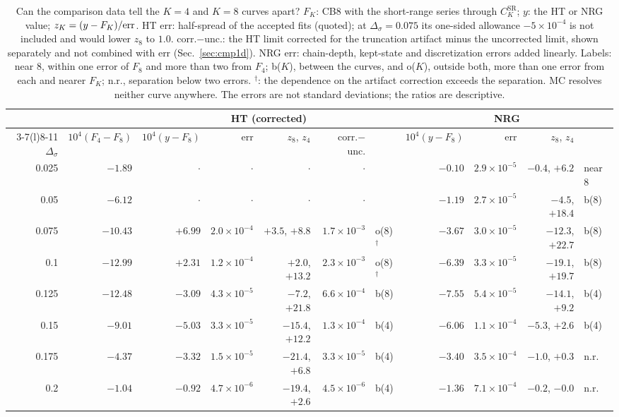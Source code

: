 \documentclass[11pt,a4paper]{article}
\numberwithin{equation}{section}
\newcommand{\Ds}{\Delta_\sigma}
\newcommand{\CSR}{C^{\mathrm{SR}}}
\newcommand{\sci}[2]{#1\times10^{#2}}
\begin{document}
\begin{table}[htbp]\centering\scriptsize\setlength{\tabcolsep}{2.5pt}
\begin{tabular}{@{}r r r r r r l r r r l@{}}
\toprule
 & & \multicolumn{5}{c}{HT (corrected)} & \multicolumn{4}{c}{NRG}\\
\cmidrule(lr){3-7}\cmidrule(l){8-11}
$\Ds$ & $10^4(F_4{-}F_8)$ & $10^4(y{-}F_8)$ & err & $z_8$, $z_4$ & corr.$-$unc. & & $10^4(y{-}F_8)$ & err & $z_8$, $z_4$ & \\ \midrule
0.025 & $-1.89$ & $\cdot$ & $\cdot$ & $\cdot$ & $\cdot$ &  & $-0.10$ & $\sci{2.9}{-5}$ & $-0.4$, $+6.2$ & near 8\\
0.05 & $-6.12$ & $\cdot$ & $\cdot$ & $\cdot$ & $\cdot$ &  & $-1.19$ & $\sci{2.7}{-5}$ & $-4.5$, $+18.4$ & b(8)\\
0.075 & $-10.43$ & $+6.99$ & $\sci{2.0}{-4}$ & $+3.5$, $+8.8$ & $\sci{1.7}{-3}$ & o(8)$^\dagger$ & $-3.67$ & $\sci{3.0}{-5}$ & $-12.3$, $+22.7$ & b(8)\\
0.1 & $-12.99$ & $+2.31$ & $\sci{1.2}{-4}$ & $+2.0$, $+13.2$ & $\sci{2.3}{-3}$ & o(8)$^\dagger$ & $-6.39$ & $\sci{3.3}{-5}$ & $-19.1$, $+19.7$ & b(8)\\
0.125 & $-12.48$ & $-3.09$ & $\sci{4.3}{-5}$ & $-7.2$, $+21.8$ & $\sci{6.6}{-4}$ & b(8) & $-7.55$ & $\sci{5.4}{-5}$ & $-14.1$, $+9.2$ & b(4)\\
0.15 & $-9.01$ & $-5.03$ & $\sci{3.3}{-5}$ & $-15.4$, $+12.2$ & $\sci{1.3}{-4}$ & b(4) & $-6.06$ & $\sci{1.1}{-4}$ & $-5.3$, $+2.6$ & b(4)\\
0.175 & $-4.37$ & $-3.32$ & $\sci{1.5}{-5}$ & $-21.4$, $+6.8$ & $\sci{3.3}{-5}$ & b(4) & $-3.40$ & $\sci{3.5}{-4}$ & $-1.0$, $+0.3$ & n.r.\\
0.2 & $-1.04$ & $-0.92$ & $\sci{4.7}{-6}$ & $-19.4$, $+2.6$ & $\sci{4.5}{-6}$ & b(4) & $-1.36$ & $\sci{7.1}{-4}$ & $-0.2$, $-0.0$ & n.r.\\
\bottomrule
\end{tabular}
\caption{Can the comparison data tell the $K=4$ and $K=8$ curves apart? $F_K$: CB8 with the
short-range series through $\CSR_K$; $y$: the HT or NRG value; $z_K=(y-F_K)/{\rm err}$. HT err:
half-spread of the accepted fits (quoted); at $\Ds=0.075$ its one-sided allowance $-\sci{5}{-4}$
is not included and would lower $z_8$ to $1.0$. corr.$-$unc.: the HT limit corrected for the
truncation artifact minus the uncorrected limit, shown separately and not combined with err
(Sec.~\ref{sec:cmp1d}). NRG err: chain-depth, kept-state and discretization errors added
linearly. Labels: near 8, within one error of $F_8$ and more than two from $F_4$; b($K$),
between the curves, and o($K$), outside both, more than one error from each and nearer $F_K$;
n.r., separation below two errors. $^\dagger$: the dependence on the artifact correction
exceeds the separation. MC resolves neither curve anywhere. The errors are not
standard deviations; the ratios are descriptive.}
\label{tab:k4k8}
\end{table}
\end{document}
